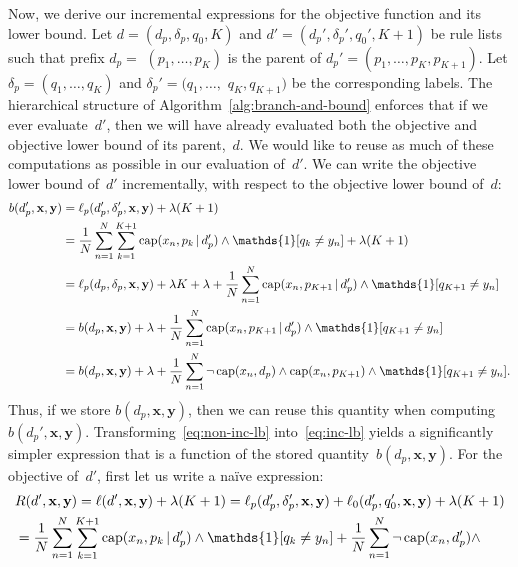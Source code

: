 \documentclass[twoside,11pt]{article}
\def\one{\mathds{1}}
\newcommand{\x}{\mathbf{x}}
\newcommand{\y}{\mathbf{y}}
\def\RL{{d}}
\def\Prefix{d_p}
\def\Labels{\delta_p}
\def\Default{q_0}
\def\Obj{R}
\def\Loss{\ell}
\def\Reg{{\lambda}}
\def\Cap{\textnormal{cap}}
\def\one{\mathds{1}}
\newcommand{\nn}{\nonumber}
\newcommand{\given}{\,|\,}
\begin{document}
\begin{arxiv}
Now, we derive our incremental expressions for the objective function and its lower bound.
%
Let ${\RL = (\Prefix, \Labels, \Default, K)}$ and
${\RL' = (\Prefix', \Labels', \Default', K + 1)}$
be rule lists such that prefix ${\Prefix =}$ ${(p_1, \dots, p_K)}$
is the parent of ${\Prefix' = (p_1, \dots, p_K, p_{K+1})}$.
%
Let ${\Labels = (q_1, \dots, q_K)}$ and
${\Labels' = (q_1, \dots,}$ ${q_K, q_{K+1})}$ be the corresponding labels.
%
The hierarchical structure of Algorithm~\ref{alg:branch-and-bound}
enforces that if we ever evaluate~$\RL'$, then we will have already
evaluated both the objective and objective lower bound of its parent,~$\RL$.
%
We would like to reuse as much of these computations as possible
in our evaluation of~$\RL'$.
%
We can write the objective lower bound of~$\RL'$ incrementally,
with respect to the objective lower bound of~$\RL$:
\begin{align}
b(\Prefix', \x, \y)
  &= \Loss_p(\Prefix', \Labels', \x, \y) + \Reg (K + 1) \nn \\
&= \frac{1}{N} \sum_{n=1}^N \sum_{k=1}^{K+1} \Cap(x_n, p_k \given \Prefix')
  \wedge \one [ q_k \neq y_n ] + \Reg (K+1) \label{eq:non-inc-lb} \\
&= \Loss_p(\Prefix, \Labels, \x, \y) + \Reg K + \Reg
  + \frac{1}{N} \sum_{n=1}^N \Cap(x_n, p_{K+1} \given \Prefix') \wedge \one [q_{K+1} \neq y_n ] \nn \\
&= b(\Prefix, \x, \y) + \Reg
  + \frac{1}{N} \sum_{n=1}^N \Cap(x_n, p_{K+1} \given \Prefix') \wedge \one [q_{K+1} \neq y_n ] \nn \\
&= b(\Prefix, \x, \y) + \Reg  + \frac{1}{N} \sum_{n=1}^N \neg\, \Cap(x_n, \Prefix) \wedge
  \Cap(x_n, p_{K+1}) \wedge \one [q_{K+1} \neq y_n].
\label{eq:inc-lb}
\end{align}
Thus, if we store $b(\Prefix, \x, \y)$, %
then we can reuse this quantity when computing $b(\Prefix', \x, \y)$.
%
Transforming~\eqref{eq:non-inc-lb} into~\eqref{eq:inc-lb} yields a
significantly simpler expression that is a function of the stored
quantity~$b(\Prefix, \x, \y)$.
%
For the objective of~$\RL'$, first let us write a na\"ive expression:
\begin{align}
&\Obj(\RL', \x, \y) = \Loss(\RL', \x, \y) + \Reg (K + 1)
= \Loss_p(\Prefix', \Labels', \x, \y) + \Loss_0(\Prefix', \Default', \x, \y) + \Reg(K + 1) \nn \\
&= \frac{1}{N} \sum_{n=1}^N \sum_{k=1}^{K+1} \Cap(x_n, p_k \given \Prefix')
  \wedge \one [ q_k \neq y_n ] + \frac{1}{N}\sum_{n=1}^N \neg\, \Cap(x_n, \Prefix') \wedge

\end{align}
\end{arxiv}
\end{document}
